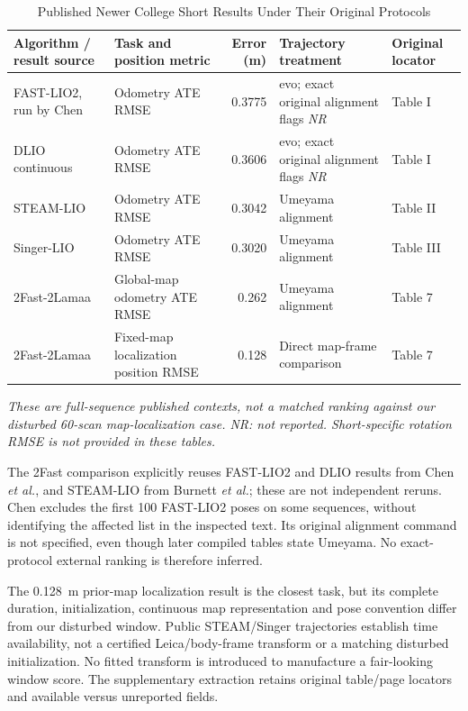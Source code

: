 \documentclass[journal,10pt,letterpaper]{IEEEtran}
\newcommand{\NR}{\textit{NR}}
\begin{document}
\begin{table}[t]
\caption{Published Newer College Short Results Under Their Original Protocols}
\label{tab:published}
\centering\footnotesize
\begin{tabular}{p{}p{}rp{}l}
\toprule
Algorithm / result source & Task and position metric & Error (m) & Trajectory treatment & Original locator \\
\midrule
FAST-LIO2, run by Chen~\cite{dlio}&Odometry ATE RMSE&0.3775&evo; exact original alignment flags \NR&Table I\\
DLIO continuous~\cite{dlio}&Odometry ATE RMSE&0.3606&evo; exact original alignment flags \NR&Table I\\
STEAM-LIO~\cite{steam}&Odometry ATE RMSE&0.3042&Umeyama alignment&Table II\\
Singer-LIO~\cite{singer}&Odometry ATE RMSE&0.3020&Umeyama alignment&Table III\\
2Fast-2Lamaa~\cite{twofast}&Global-map odometry ATE RMSE&0.262&Umeyama alignment&Table 7\\
2Fast-2Lamaa~\cite{twofast}&Fixed-map localization position RMSE&0.128&Direct map-frame comparison&Table 7\\
\bottomrule
\end{tabular}
\par\smallskip\raggedright
\textit{These are full-sequence published contexts, not a matched ranking against our disturbed 60-scan map-localization case. \NR: not reported. Short-specific rotation RMSE is not provided in these tables.}
\end{table}

The 2Fast comparison explicitly reuses FAST-LIO2 and DLIO results from Chen \textit{et al.}, and STEAM-LIO from Burnett \textit{et al.}; these are not independent reruns. Chen excludes the first 100 FAST-LIO2 poses on some sequences, without identifying the affected list in the inspected text. Its original alignment command is not specified, even though later compiled tables state Umeyama. No exact-protocol external ranking is therefore inferred.

The 0.128~m prior-map localization result is the closest task, but its complete duration, initialization, continuous map representation and pose convention differ from our disturbed window. Public STEAM/Singer trajectories establish time availability, not a certified Leica/body-frame transform or a matching disturbed initialization. No fitted transform is introduced to manufacture a fair-looking window score. The supplementary extraction retains original table/page locators and available versus unreported fields.
\end{document}
